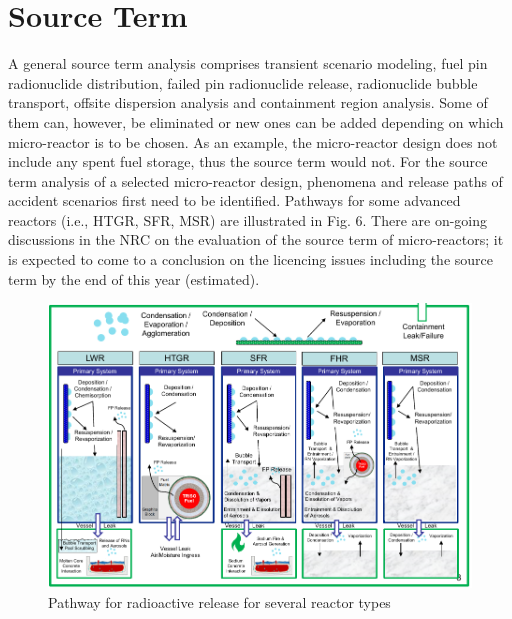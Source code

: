 \documentclass[10pt,a4paper]{article}
\begin{document}
\section{Source Term}
A general source term analysis comprises transient scenario modeling, fuel pin radionuclide distribution, failed pin radionuclide release, radionuclide bubble transport, offsite dispersion analysis and containment region analysis. Some of them can, however, be eliminated or new ones can be added depending on which micro-reactor is to be chosen. As an example, the micro-reactor design does not include any spent fuel storage, thus the source term would not.
For the source term analysis of a selected micro-reactor design, phenomena and release paths of accident scenarios first need to be identified. Pathways for some advanced reactors (i.e., HTGR, SFR, MSR) are illustrated in Fig. 6. There are on-going discussions in the NRC on the evaluation of the source term of micro-reactors; it is expected to come to a conclusion on the licencing issues including the source term by the end of this year (estimated). 

\begin{figure}[hbtp]
\centering
\includegraphics[scale=0.6]{Figs/fig6*.jpeg}
\caption{Pathway for radioactive release for several reactor types}
\end{figure}
\end{document}
